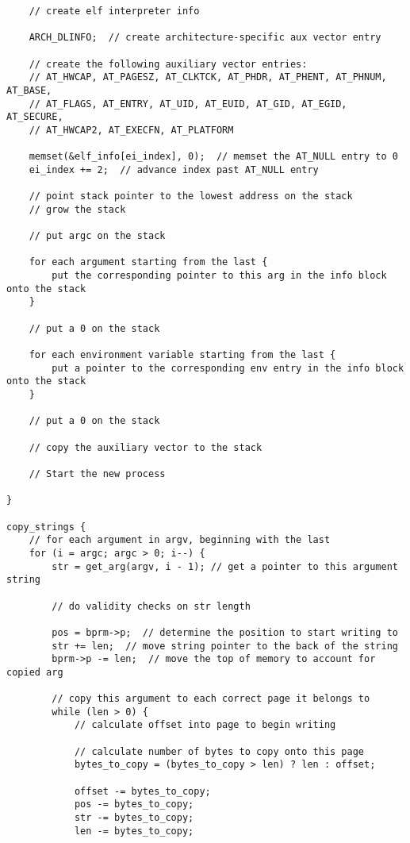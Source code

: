 \documentclass[a4paper]{article}
\begin{document}
{\begin{verbatim}
    // create elf interpreter info
    
    ARCH_DLINFO;  // create architecture-specific aux vector entry
    
    // create the following auxiliary vector entries:
    // AT_HWCAP, AT_PAGESZ, AT_CLKTCK, AT_PHDR, AT_PHENT, AT_PHNUM, AT_BASE, 
    // AT_FLAGS, AT_ENTRY, AT_UID, AT_EUID, AT_GID, AT_EGID, AT_SECURE, 
    // AT_HWCAP2, AT_EXECFN, AT_PLATFORM
    
    memset(&elf_info[ei_index], 0);  // memset the AT_NULL entry to 0
    ei_index += 2;  // advance index past AT_NULL entry
    
    // point stack pointer to the lowest address on the stack
    // grow the stack
    
    // put argc on the stack
    
    for each argument starting from the last {
        put the corresponding pointer to this arg in the info block onto the stack
    }
    
    // put a 0 on the stack
    
    for each environment variable starting from the last {
        put a pointer to the corresponding env entry in the info block onto the stack
    }
    
    // put a 0 on the stack
    
    // copy the auxiliary vector to the stack
    
    // Start the new process
    
}

copy_strings {
    // for each argument in argv, beginning with the last 
    for (i = argc; argc > 0; i--) {
        str = get_arg(argv, i - 1); // get a pointer to this argument string
        
        // do validity checks on str length
        
        pos = bprm->p;  // determine the position to start writing to
        str += len;  // move string pointer to the back of the string
        bprm->p -= len;  // move the top of memory to account for copied arg
        
        // copy this argument to each correct page it belongs to
        while (len > 0) {
            // calculate offset into page to begin writing
            
            // calculate number of bytes to copy onto this page
            bytes_to_copy = (bytes_to_copy > len) ? len : offset;
            
            offset -= bytes_to_copy;
            pos -= bytes_to_copy;
            str -= bytes_to_copy; 
            len -= bytes_to_copy; 
            

\end{verbatim}}
\end{document}
